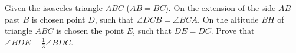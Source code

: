 \problem{}
Given the isosceles triangle $ABC$ ($AB = BC$).
On the extension of the side $AB$ past $B$ is chosen point $D$, such that $\angle DCB = \angle BCA$.
On the altitude $BH$ of triangle $ABC$ is chosen the point $E$, such that $DE = DC$.
Prove that $\angle BDE = \frac{1}{3}\angle BDC$.

\solution

\endproblem
